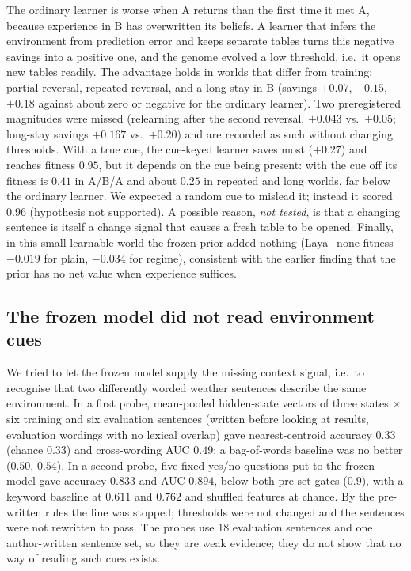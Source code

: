 \documentclass[11pt]{article}
\begin{document}
The ordinary learner is worse when A returns than the first time it met A, because experience in B has overwritten its beliefs. A learner that infers the environment from prediction error and keeps separate tables turns this negative savings into a positive one, and the genome evolved a low threshold, i.e.\ it opens new tables readily. The advantage holds in worlds that differ from training: partial reversal, repeated reversal, and a long stay in B (savings $+0.07$, $+0.15$, $+0.18$ against about zero or negative for the ordinary learner). Two preregistered magnitudes were missed (relearning after the second reversal, $+0.043$ vs.\ $+0.05$; long-stay savings $+0.167$ vs.\ $+0.20$) and are recorded as such without changing thresholds. With a true cue, the cue-keyed learner saves most ($+0.27$) and reaches fitness $0.95$, but it depends on the cue being present: with the cue off its fitness is $0.41$ in A/B/A and about $0.25$ in repeated and long worlds, far below the ordinary learner. We expected a random cue to mislead it; instead it scored $0.96$ (hypothesis not supported). A possible reason, \emph{not tested}, is that a changing sentence is itself a change signal that causes a fresh table to be opened. Finally, in this small learnable world the frozen prior added nothing (Laya$-$none fitness $-0.019$ for plain, $-0.034$ for regime), consistent with the earlier finding that the prior has no net value when experience suffices.

\subsection{The frozen model did not read environment cues}
We tried to let the frozen model supply the missing context signal, i.e.\ to recognise that two differently worded weather sentences describe the same environment. In a first probe, mean-pooled hidden-state vectors of three states $\times$ six training and six evaluation sentences (written before looking at results, evaluation wordings with no lexical overlap) gave nearest-centroid accuracy $0.33$ (chance $0.33$) and cross-wording AUC $0.49$; a bag-of-words baseline was no better ($0.50$, $0.54$). In a second probe, five fixed yes/no questions put to the frozen model gave accuracy $0.833$ and AUC $0.894$, below both pre-set gates ($0.9$), with a keyword baseline at $0.611$ and $0.762$ and shuffled features at chance. By the pre-written rules the line was stopped; thresholds were not changed and the sentences were not rewritten to pass. The probes use 18 evaluation sentences and one author-written sentence set, so they are weak evidence; they do not show that no way of reading such cues exists.
\end{document}
